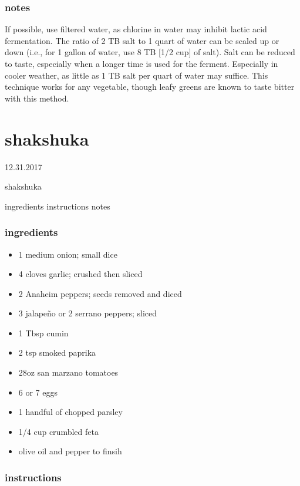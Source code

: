 \documentclass[]{book}
\providecommand{\tightlist}{%
  \setlength{\itemsep}{0pt}\setlength{\parskip}{0pt}}
\begin{document}
\hypertarget{notes-15}{%
\subsection{notes}\label{notes-15}}

If possible, use filtered water, as chlorine in water may inhibit lactic acid fermentation. The ratio of 2 TB salt to 1 quart of water can be scaled up or down (i.e., for 1 gallon of water, use 8 TB {[}1/2 cup{]} of salt). Salt can be reduced to taste, especially when a longer time is used for the ferment. Especially in cooler weather, as little as 1 TB salt per quart of water may suffice. This technique works for any vegetable, though leafy greens are known to taste bitter with this method.

\hypertarget{shakshuka}{%
\chapter{shakshuka}\label{shakshuka}}

12.31.2017

shakshuka

ingredients \textbar{}
instructions \textbar{}
notes \textbar{}

\hypertarget{ingredients-16}{%
\subsection{ingredients}\label{ingredients-16}}

\begin{itemize}
\tightlist
\item
  1 medium onion; small dice
\item
  4 cloves garlic; crushed then sliced
\item
  2 Anaheim peppers; seeds removed and diced
\item
  3 jalapeño or 2 serrano peppers; sliced
\item
  1 Tbsp cumin
\item
  2 tsp smoked paprika
\item
  28oz san marzano tomatoes
\item
  6 or 7 eggs
\item
  1 handful of chopped parsley
\item
  1/4 cup crumbled feta
\item
  olive oil and pepper to finsih
\end{itemize}

\hypertarget{instructions-16}{%
\subsection{instructions}\label{instructions-16}}
\end{document}

